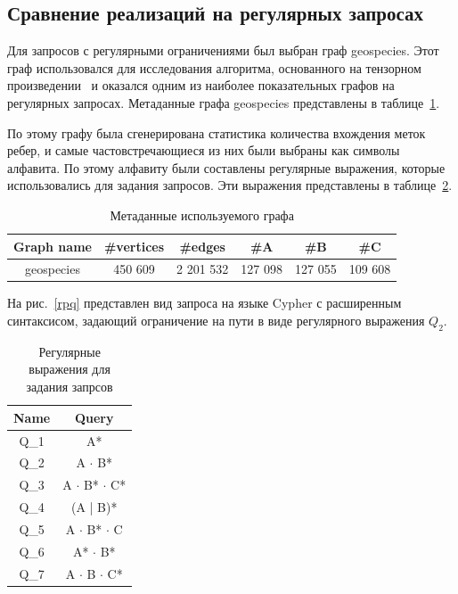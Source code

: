 \documentclass[14pt]{matmex-diploma-custom}
\begin{document}
\subsection{Сравнение реализаций на регулярных запросах}
Для запросов с регулярными ограничениями был выбран граф geospecies. Этот граф использовался для исследования алгоритма, основанного на тензорном произведении~\cite{tensoralgo} и оказался одним из наиболее показательных графов на регулярных запросах. Метаданные графа geospecies представлены в таблице~\ref{tab:geospecies}.

По этому графу была сгенерирована статистика количества вхождения меток ребер, и самые частовстречающиеся из них были выбраны как символы алфавита. По этому алфавиту были составлены регулярные выражения, которые использовались для задания запросов. Эти выражения представлены в таблице~\ref{tab:regex}.

\begin{table}[h!]
    \centering
    \begin{tabular}{|c||c|c|c|c|c|}
        \hline
         Graph name & \#vertices & \#edges & \#A & \#B & \#C \\
        \hline \hline
         geospecies & 450 609 & 2 201 532 & 127 098 & 127 055 & 109 608\\
         \hline
    \end{tabular}
    \caption{Метаданные используемого графа}
    \label{tab:geospecies}
\end{table}

На рис.~\ref{rpq} представлен вид запроса на языке Cypher с расширенным синтаксисом, задающий ограничение на пути в виде регулярного выражения $Q_2$.
\begin{table}[h!]
    \centering
    \begin{tabular}{|c||c|}
        \hline
        Name & Query \\
        \hline
        Q_1 & A* \\
        Q_2 & A $\cdot$ B* \\
        Q_3 & A $\cdot$ B* $\cdot$ C* \\
        Q_4 & (A | B)* \\
        Q_5 & A $\cdot$ B* $\cdot$ C \\
        Q_6 & A* $\cdot$ B* \\
        Q_7 & A $\cdot$ B $\cdot$ C* \\
        \hline
    \end{tabular}
    \caption{Регулярные выражения для задания запрсов}
    \label{tab:regex}
\end{table}
\end{document}
